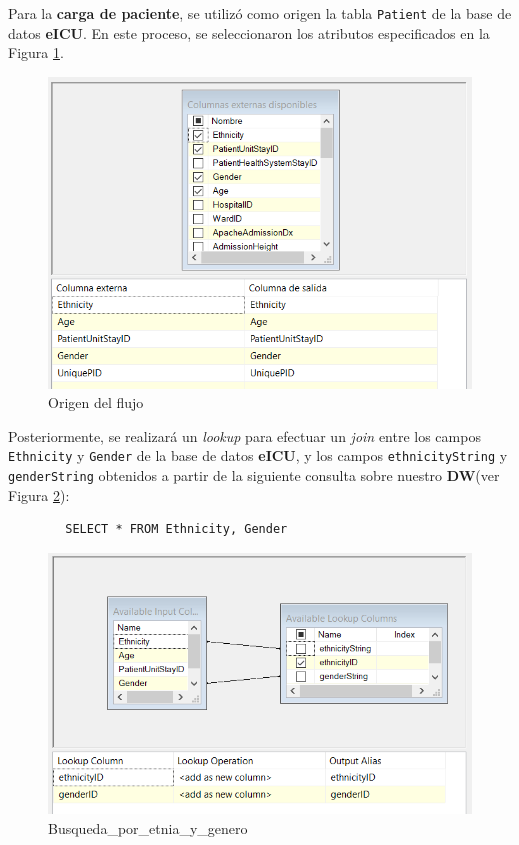 \documentclass[12pt, a4paper, twoside]{article}
\begin{document}
	Para la \textbf{carga de paciente}, se utilizó como origen la tabla \texttt{Patient} de la base de datos \textbf{eICU}. En este proceso, se seleccionaron los atributos especificados en la Figura \ref{fig:24}.
	
	
	\begin{figure}[H]
		\centering
		\includegraphics[width=1\textwidth]{image/108_carga_paciente_origen.png}
		\caption{Origen del flujo}
		\label{fig:24}
	\end{figure}
	
	Posteriormente, se realizará un \textit{lookup} para efectuar un \textit{join} entre los campos \texttt{Ethnicity} y \texttt{Gender} de la base de datos \textbf{eICU}, y los campos \texttt{ethnicityString} y \texttt{genderString} obtenidos a partir de la siguiente consulta sobre nuestro \textbf{DW}(ver Figura \ref{fig:25}):
	
	\begin{verbatim}
		SELECT * FROM Ethnicity, Gender
	\end{verbatim}
	
	
	\begin{figure}[H]
		\centering
		\includegraphics[width=1\textwidth]{image/108_carga_paciente_lookup.png}
		\caption{Busqueda\_por\_etnia\_y\_genero}
		\label{fig:25}
	\end{figure}
\end{document}
